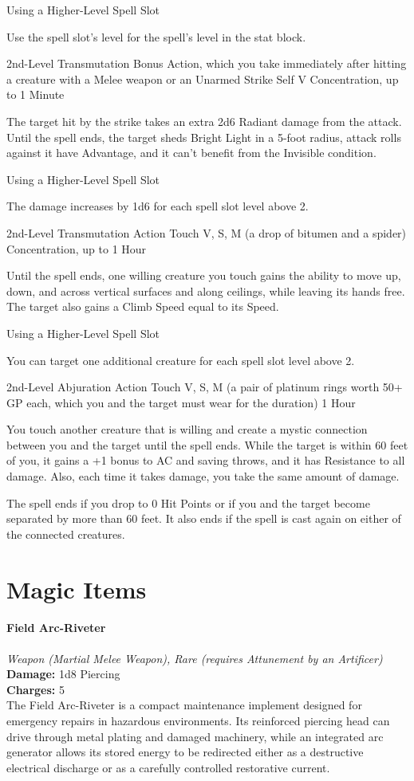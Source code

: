 \documentclass[letterpaper,openany,oneside,twocolumn]{book}
\begin{document}
\subparagraph*{Using a Higher-Level Spell Slot} Use the spell slot's level for the spell's level in the stat block.

	{2nd-Level Transmutation}
	{Bonus Action, which you take immediately after hitting a creature with a Melee weapon or an Unarmed Strike}
	{Self}
	{V}
	{Concentration, up to 1 Minute}

The target hit by the strike takes an extra 2d6 Radiant damage from the attack. Until the spell ends, the target sheds Bright Light in a 5-foot radius, attack rolls against it have Advantage, and it can't benefit from the Invisible condition.

\subparagraph*{Using a Higher-Level Spell Slot} The damage increases by 1d6 for each spell slot level above 2.

	{2nd-Level Transmutation}
	{Action}
	{Touch}
	{V, S, M (a drop of bitumen and a spider)}
	{Concentration, up to 1 Hour}

Until the spell ends, one willing creature you touch gains the ability to move up, down, and across vertical surfaces and along ceilings, while leaving its hands free. The target also gains a Climb Speed equal to its Speed.

\subparagraph*{Using a Higher-Level Spell Slot} You can target one additional creature for each spell slot level above 2.

	{2nd-Level Abjuration}
	{Action}
	{Touch}
	{V, S, M (a pair of platinum rings worth 50+ GP each, which you and the target must wear for the duration)}
	{1 Hour}

You touch another creature that is willing and create a mystic connection between you and the target until the spell ends. While the target is within 60 feet of you, it gains a +1 bonus to AC and saving throws, and it has Resistance to all damage. Also, each time it takes damage, you take the same amount of damage.

The spell ends if you drop to 0 Hit Points or if you and the target become separated by more than 60 feet. It also ends if the spell is cast again on either of the connected creatures.

\part*{Magic Items}
\subsection*{Field Arc-Riveter}
\textit{Weapon (Martial Melee Weapon), Rare (requires Attunement by an Artificer)}\\
\textbf{Damage:} 1d8 Piercing\\
\textbf{Charges:} 5\\
The Field Arc-Riveter is a compact maintenance implement designed for emergency repairs in hazardous environments. Its reinforced piercing head can drive through metal plating and damaged machinery, while an integrated arc generator allows its stored energy to be redirected either as a destructive electrical discharge or as a carefully controlled restorative current.
\end{document}

